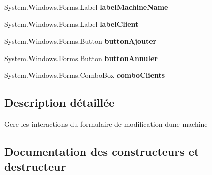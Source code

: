 \begin{DoxyCompactItemize}
System.\+Windows.\+Forms.\+Label {\bfseries label\+Machine\+Name}
\item 
\mbox{\label{class_m_t_connect_agent_1_1_form_modifie_machine_a2ad6243106d121056db9f2740c873c48}} 
System.\+Windows.\+Forms.\+Label {\bfseries label\+Client}
\item 
\mbox{\label{class_m_t_connect_agent_1_1_form_modifie_machine_a0c2bf5042a7cd8d11e54e692bc76e9dc}} 
System.\+Windows.\+Forms.\+Button {\bfseries button\+Ajouter}
\item 
\mbox{\label{class_m_t_connect_agent_1_1_form_modifie_machine_aaac46cad77c30ea981eb019aa70bae1a}} 
System.\+Windows.\+Forms.\+Button {\bfseries button\+Annuler}
\item 
\mbox{\label{class_m_t_connect_agent_1_1_form_modifie_machine_aff5f62a4da2c5d835d93fe47e021b853}} 
System.\+Windows.\+Forms.\+Combo\+Box {\bfseries combo\+Clients}
\end{DoxyCompactItemize}


\subsection{Description détaillée}
Gere les interactions du formulaire de modification d\textquotesingle{}une machine 



\subsection{Documentation des constructeurs et destructeur}
\mbox{\label{class_m_t_connect_agent_1_1_form_modifie_machine_ae62f91bfe4ad79f9a56396faab542324}} 

